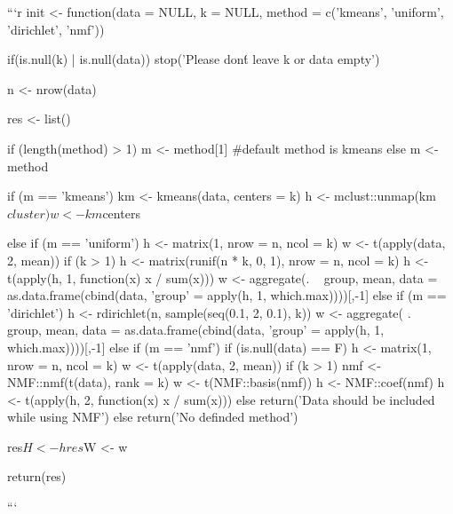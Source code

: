 \documentclass[
]{article}
\begin{document}
{{```r
init <- function(data = NULL, k = NULL, method = c('kmeans', 'uniform', 'dirichlet', 'nmf')) {
  if(is.null(k) | is.null(data)){
    stop('Please don\'t leave k or data empty')
  }

  n <- nrow(data)

  res <- list()

  if (length(method) > 1) {
    m <- method[1]            #default method is kmeans
  }
  else {
    m <- method
  }

  if (m == 'kmeans') {
    km <- kmeans(data, centers = k)
    h <- mclust::unmap(km$cluster)
    w <- km$centers
  }

  else if (m == 'uniform') {
    h <- matrix(1, nrow = n, ncol = k)
    w <- t(apply(data, 2, mean))
    if (k > 1) {
      h <- matrix(runif(n * k, 0, 1), nrow = n, ncol = k)
      h <- t(apply(h, 1, function(x) x / sum(x)))
      w <- aggregate(. ~ group, mean, data = as.data.frame(cbind(data, 'group' = apply(h, 1, which.max))))[,-1]
    }
  }
  else if (m == 'dirichlet') {
    h <- rdirichlet(n, sample(seq(0.1, 2, 0.1), k))
    w <- aggregate( . ~ group, mean, data = as.data.frame(cbind(data, 'group' = apply(h, 1, which.max))))[,-1]
  }
  else if (m == 'nmf') {
    if (is.null(data) == F) {
      h <- matrix(1, nrow = n, ncol = k)
      w <- t(apply(data, 2, mean))
      if (k > 1) {
        nmf <- NMF::nmf(t(data), rank = k)
        w <- t(NMF::basis(nmf))
        h <- NMF::coef(nmf)
        h <- t(apply(h, 2, function(x) x / sum(x)))
      }
    }
    else {return('Data should be included while using NMF')}
  }
  else {return('No definded method')}

  res$H <- h
  res$W <- w

  return(res)
}
```

}}
\end{document}

